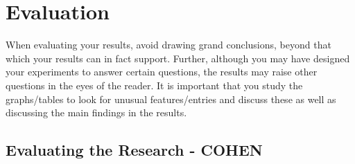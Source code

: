 \section{Evaluation}

When evaluating your results, avoid drawing grand conclusions, beyond that which your results can in fact support. Further, although you may have designed your experiments to answer certain questions, the results may raise other questions in the eyes of the reader. It is important that you study the graphs/tables to look for unusual features/entries and discuss these as well as discussing the main findings in the results. 

\subsection{Evaluating the Research - COHEN}




\citep{cohen88}

